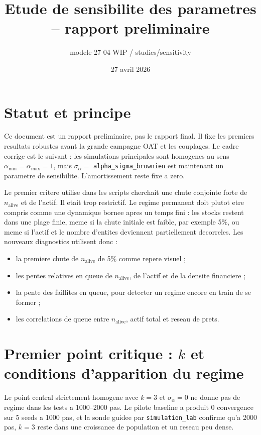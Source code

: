 \documentclass[11pt,a4paper]{article}
\title{Etude de sensibilite des parametres -- rapport preliminaire}
\author{modele-27-04-WIP / studies/sensitivity}
\date{27 avril 2026}
\begin{document}
\maketitle

\section{Statut et principe}

Ce document est un rapport preliminaire, pas le rapport final. Il fixe les
premiers resultats robustes avant la grande campagne OAT et les couplages.
Le cadre corrige est le suivant : les simulations principales sont homogenes
au sens \(\alpha_{\min}=\alpha_{\max}=1\), mais
\(\sigma_\alpha=\) \texttt{alpha\_sigma\_brownien} est maintenant un parametre
de sensibilite. L'amortissement reste fixe a zero.

Le premier critere utilise dans les scripts cherchait une chute conjointe forte
de \(n_{\mathrm{alive}}\) et de l'actif. Il etait trop restrictif. Le regime
permanent doit plutot etre compris comme une dynamique bornee apres un temps
fini : les stocks restent dans une plage finie, meme si la chute initiale est
faible, par exemple 5\%, ou meme si l'actif et le nombre d'entites deviennent
partiellement decorreles. Les nouveaux diagnostics utilisent donc :
\begin{itemize}
  \item la premiere chute de \(n_{\mathrm{alive}}\) de 5\% comme repere visuel ;
  \item les pentes relatives en queue de \(n_{\mathrm{alive}}\), de l'actif et
  de la densite financiere ;
  \item la pente des faillites en queue, pour detecter un regime encore en train
  de se former ;
  \item les correlations de queue entre \(n_{\mathrm{alive}}\), actif total et
  reseau de prets.
\end{itemize}

\section{Premier point critique : \(k\) et conditions d'apparition du regime}

Le point central strictement homogene avec \(k=3\) et
\(\sigma_\alpha=0\) ne donne pas de regime dans les tests a 1000--2000 pas.
Le pilote baseline a produit 0 convergence sur 5 seeds a 1000 pas, et la sonde
guidee par \texttt{simulation\_lab} confirme qu'a 2000 pas, \(k=3\) reste dans
une croissance de population et un reseau peu dense.
\end{document}
